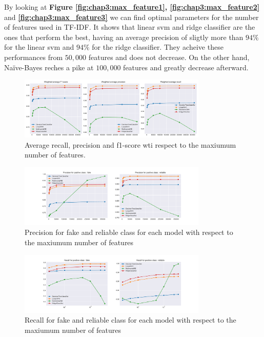 By looking at \textbf{Figure \ref{fig:chap3:max_feature1}, \ref{fig:chap3:max_feature2}} and \textbf{\ref{fig:chap3:max_feature3}} we can find optimal parameters for the number of features used in TF-IDF. It shows that linear svm and ridge classifier are the ones that perform the best, having an average precision of sligtly more than $94\%$ for the linear svm and $94\%$ for the ridge classifier. They acheive these performances from $50,000$ features and does not decrease. On the other hand, Naïve-Bayes reches a pike at $100,000$ features and greatly decrease afterward. \\

\begin{figure}
	\centering
	\includegraphics[width=0.8\textwidth]{images/chapitre3/ML_fake_average}
	\caption{Average recall, precision and f1-score wti respect to the maxiumum number of features.}
	\label{fig:chap3:max_feat1}
\end{figure}
\begin{figure}
	\centering
	\includegraphics[width=0.8\textwidth]{images/chapitre3/ML_fake_precision}
	\caption{Precision for fake and reliable class for each model with respect to the maxiumum number of features}
	\label{fig:chap3:max_feat2}
\end{figure}
\begin{figure}
	\centering
	\includegraphics[width=0.8\textwidth]{images/chapitre3/ML_fake_recall}
	\caption{Recall for fake and reliable class for each model with respect to the maxiumum number of features}
	\label{fig:chap3:max_feat3}
\end{figure}


